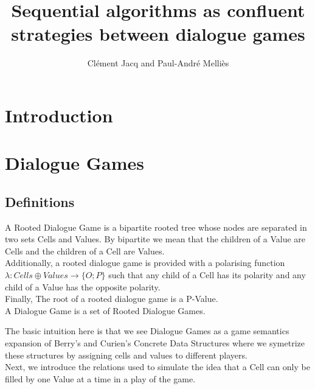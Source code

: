 \documentclass[a4paper,UKenglish]{lipics}
\title{Sequential algorithms as confluent strategies between dialogue games}
\author{Clément Jacq and Paul-André Melliès}
\begin{document}
\maketitle
\section*{Introduction}
\hspace{1.2cm}  

\section{Dialogue Games}
\subsection{Definitions}
\begin{definition}
A Rooted Dialogue Game is a bipartite rooted tree whose nodes are separated in two sets Cells and Values. By bipartite we mean that the children of a Value are Cells and the children of a Cell are Values. \\Additionally, a rooted dialogue game is provided with a polarising function $\lambda : Cells \oplus Values \rightarrow \{O;P\}$ such that any child of a Cell has its polarity and any child of a Value has the opposite polarity.\\
Finally, The root of a rooted dialogue game is a P-Value. \\
A Dialogue Game is a set of Rooted Dialogue Games.
\end{definition}
The basic intuition here is that we see Dialogue Games as a game semantics expansion of Berry's and Curien's Concrete Data Structures where we symetrize these structures by assigning cells and values to different players.\\ Next, we introduce the relations used to simulate the idea that a Cell can only be filled by one Value at a time in a play of the game.
\end{document}
